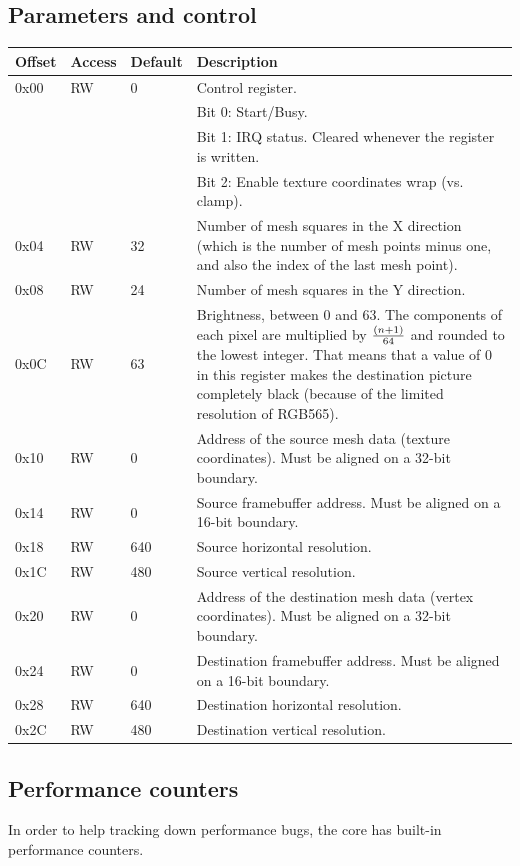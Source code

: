 \documentclass[a4paper,11pt]{article}
\begin{document}
\subsection{Parameters and control}
\begin{tabularx}{\textwidth}{|l|l|l|X|}
\hline
\bf{Offset} & \bf{Access} & \bf{Default} & \bf{Description} \\
\hline
0x00 & RW & 0 & Control register. \\
& & & Bit 0: Start/Busy.\\
& & & Bit 1: IRQ status. Cleared whenever the register is written. \\
& & & Bit 2: Enable texture coordinates wrap (vs. clamp). \\
\hline
0x04 & RW & 32 & Number of mesh squares in the X direction (which is the number of mesh points minus one, and also the index of the last mesh point). \\
\hline
0x08 & RW & 24 & Number of mesh squares in the Y direction. \\
\hline
0x0C & RW & 63 & Brightness, between 0 and 63. The components of each pixel are multiplied by $ (n+1) \over 64 $ and rounded to the lowest integer. That means that a value of 0 in this register makes the destination picture completely black (because of the limited resolution of RGB565). \\
\hline
0x10 & RW & 0 & Address of the source mesh data (texture coordinates). Must be aligned on a 32-bit boundary. \\
\hline
0x14 & RW & 0 & Source framebuffer address. Must be aligned on a 16-bit boundary. \\
\hline
0x18 & RW & 640 & Source horizontal resolution. \\
\hline
0x1C & RW & 480 & Source vertical resolution. \\
\hline
0x20 & RW & 0 & Address of the destination mesh data (vertex coordinates). Must be aligned on a 32-bit boundary. \\
\hline
0x24 & RW & 0 & Destination framebuffer address. Must be aligned on a 16-bit boundary. \\
\hline
0x28 & RW & 640 & Destination horizontal resolution. \\
\hline
0x2C & RW & 480 & Destination vertical resolution. \\
\hline
\end{tabularx}

\subsection{Performance counters}
In order to help tracking down performance bugs, the core has built-in performance counters.
\end{document}
